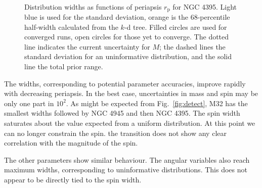 \documentclass[useAMS,usedcolumn,usegraphicx,usenatbib]{mn2e}
\newcommand{\figref}[1]{Fig.~\ref{fig:#1}}
\newcommand{\sub}[1]{\ensuremath{_\mathrm{#1}}}
\begin{document}
\begin{figure}
\begin{center}
 \quad
{} \\
\caption{Distribution widths as functions of periapsis $r\sub{p}$ for NGC 4395. Light blue is used for the standard deviation, orange is the $68$-percentile half-width calculated from the $k$-d tree. Filled circles are used for converged runs, open circles for those yet to converge. The dotted line indicates the current uncertainty for $M$; the dashed lines the standard deviation for an uninformative distribution, and the solid line the total prior range.}
\end{center}
\end{figure}

The widths, corresponding to potential parameter accuracies, improve rapidly with decreasing periapsis. In the best case, uncertainties in mass and spin may be only one part in $10^2$. As might be expected from \figref{detect}, M32 has the smallest widths followed by NGC 4945 and then NGC 4395. The spin width saturates about the value expected from a uniform distribution. At this point we can no longer constrain the spin. the transition does not show any clear correlation with the magnitude of the spin.

The other parameters show similar behaviour. The angular variables also reach maximum widths, corresponding to uninformative distributions. This does not appear to be directly tied to the spin width.
\end{document}

